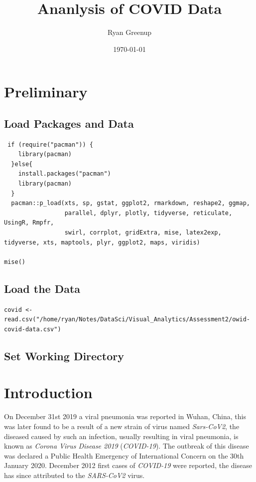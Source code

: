 \documentclass[11pt]{article}
\author{Ryan Greenup}
\date{\today}
\title{Ananlysis of COVID Data}
\begin{document}
\maketitle
\tableofcontents


\section{Preliminary}
\label{sec:org4df1a26}
\subsection{Load Packages and Data}
\label{sec:org3fd505b}

\begin{verbatim}
 if (require("pacman")) {
    library(pacman)
  }else{
    install.packages("pacman")
    library(pacman)
  }
  pacman::p_load(xts, sp, gstat, ggplot2, rmarkdown, reshape2, ggmap,
                 parallel, dplyr, plotly, tidyverse, reticulate, UsingR, Rmpfr,
                 swirl, corrplot, gridExtra, mise, latex2exp, tidyverse, xts, maptools, plyr, ggplot2, maps, viridis)

mise()

\end{verbatim}

\subsection{Load the Data}
\label{sec:org225660a}
\begin{verbatim}
covid <- read.csv("/home/ryan/Notes/DataSci/Visual_Analytics/Assessment2/owid-covid-data.csv")

\end{verbatim}

\subsection{Set Working Directory}
\label{sec:org00c0e47}

\section{Introduction}
\label{sec:org8153164}
On December 31st 2019 a viral pneumonia was reported in Wuhan, China, this was
  later found to be a result of a new strain of virus named \emph{Sars-CoV2}, the
  diseased caused by such an infection, usually resulting in viral pneumonia, is
  known as \emph{Corona Virus Disease 2019} (\emph{COVID-19}). The outbreak of this disease was declared a Public Health Emergency of International Concern on the 30th January 2020.
  \cite{worldhealthorganization2020} December 2012 first cases of \emph{COVID-19} were
  reported, the disease has since attributed to the \emph{SARS-CoV2} virus.
\end{document}
